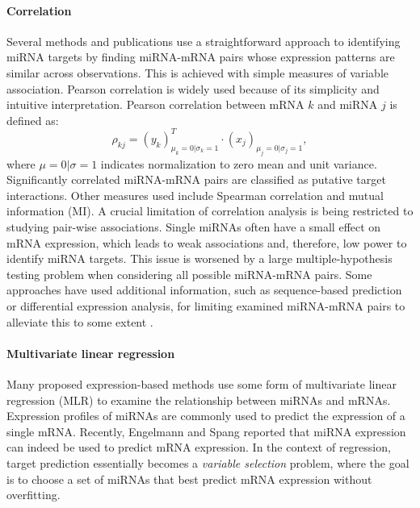 \paragraph{Correlation}
Several methods and publications use a straightforward approach to identifying
miRNA targets by finding miRNA-mRNA pairs whose expression patterns are
similar across observations. This is achieved with simple measures of variable
association. Pearson correlation is widely used because of its simplicity
and intuitive interpretation. Pearson correlation between mRNA $k$ and miRNA
$j$ is defined as:
\begin{equation}
	\rho_{kj} = (y_k)_{\mu_k=0|\sigma_k=1}^T \cdot (x_j)_{\mu_j=0|\sigma_j=1},
	\label{eq:pearson}
\end{equation}
where $\mu=0|\sigma=1$ indicates normalization to zero mean and unit
variance. Significantly correlated miRNA-mRNA pairs are classified as putative
target interactions. Other measures used include Spearman correlation and
mutual information (MI). A crucial limitation of correlation analysis is being
restricted to studying pair-wise associations. Single miRNAs often have a
small effect on mRNA expression, which leads to weak associations and,
therefore, low power to identify miRNA targets. This issue is worsened by a
large multiple-hypothesis testing problem when considering all possible miRNA-mRNA
pairs. Some approaches have used additional information, such as
sequence-based prediction or differential expression analysis, for limiting
examined miRNA-mRNA pairs to alleviate this to some extent
\citep{Muniategui2013}.

\paragraph{Multivariate linear regression}
Many proposed expression-based methods use some form of multivariate linear
regression (MLR) to examine the relationship between miRNAs and mRNAs.
Expression profiles of miRNAs are commonly used to predict the expression of a
single mRNA. Recently, Engelmann and Spang \citep{Engelmann2012} reported that miRNA expression can indeed be used to
predict mRNA expression. In the context of regression,
target prediction essentially becomes a \emph{variable selection} problem, where the
goal is to choose a set of miRNAs that best predict mRNA expression without
overfitting.


